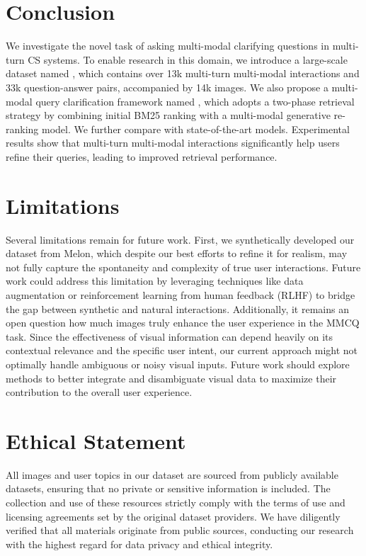 \documentclass[11pt]{article}
\begin{document}
\section{Conclusion}
We investigate the novel task of asking multi-modal clarifying questions in multi-turn \ac{CS} systems. To enable research in this domain, we introduce a large-scale dataset named \OurData{}, which contains over 13k multi-turn multi-modal interactions and 33k question-answer pairs, accompanied by 14k images. We also propose a multi-modal query clarification framework named \OurModel{}, which adopts a two-phase retrieval strategy by combining initial BM25 ranking with a multi-modal generative re-ranking model. We further compare \OurModel{} with state-of-the-art models. Experimental results show that multi-turn multi-modal interactions significantly help users refine their queries, leading to improved retrieval performance. 


\section*{Limitations}
Several limitations remain for future work. First, we synthetically developed our dataset from Melon, which despite our best efforts to refine it for realism, may not fully capture the spontaneity and complexity of true user interactions. Future work could address this limitation by leveraging techniques like data augmentation or reinforcement learning from human feedback (RLHF) to bridge the gap between synthetic and natural interactions. Additionally, it remains an open question how much images truly enhance the user experience in the MMCQ task. Since the effectiveness of visual information can depend heavily on its contextual relevance and the specific user intent, our current approach might not optimally handle ambiguous or noisy visual inputs. Future work should explore methods to better integrate and disambiguate visual data to maximize their contribution to the overall user experience.


\section*{Ethical Statement}
All images and user topics in our dataset are sourced from publicly available datasets, ensuring that no private or sensitive information is included. The collection and use of these resources strictly comply with the terms of use and licensing agreements set by the original dataset providers. 
We have diligently verified that all materials originate from public sources, conducting our research with the highest regard for data privacy and ethical integrity.
\end{document}
